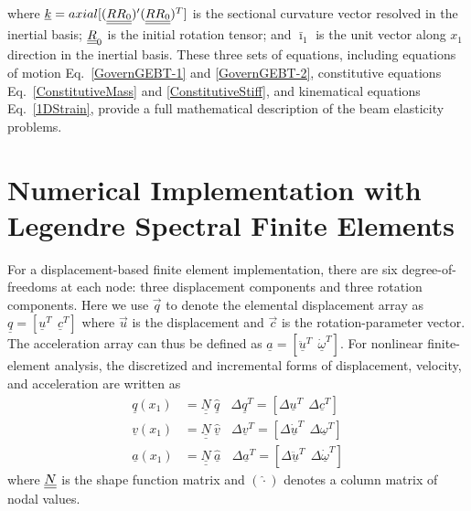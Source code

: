 where $\underline{k} = axial [(\underline{\underline{R R_0}})^\prime (\underline{\underline{R R_0}})^T]$ is the sectional
curvature vector resolved in the inertial basis; $\underline{\underline{R}}_0$ is the initial rotation tensor; and $\bar{\imath}_1$ is the unit vector along $x_1$ direction in the inertial basis. 
These three sets of equations, including equations of motion Eq.~\eqref{GovernGEBT-1} and \eqref{GovernGEBT-2}, constitutive equations
Eq.~\eqref{ConstitutiveMass} and \eqref{ConstitutiveStiff}, and kinematical
equations Eq.~\eqref{1DStrain}, provide a full mathematical description of the beam elasticity problems. 

\section{Numerical Implementation with Legendre Spectral Finite Elements}
\label{sec:NumImp}
For a displacement-based finite element implementation, there are six degree-of-freedoms at each node: three displacement components and three rotation components. 
Here we use $\vec{q}$ to denote the elemental displacement array as $\underline{q}=\left[
\underline{u}^T~~\underline{c}^T\right]$ where $\vec{u}$ is the displacement and $\vec{c}$ is the rotation-parameter vector. 
The acceleration array can thus be defined as $\underline{a}=\left[ \ddot{\underline{u}}^T~~ \dot{\underline{\omega}}^T \right]$. 
For nonlinear finite-element analysis, the discretized and incremental forms of displacement, velocity, and acceleration are written as
\begin{align}
	\label{Discretized}
	\underline{q} (x_1) &= \underline{\underline{N}} ~\hat{\underline{q}}~~~~\Delta \underline{q}^T = \left[ \Delta \underline{u}^T~~\Delta \underline{c}^T \right] \\
	\underline{v}(x_1) &= \underline{\underline{N}}~\hat{\underline{v}}~~~~\Delta \underline{v}^T = \left[\Delta \underline{\dot{u}}^T~~\Delta \underline{\omega}^T \right] \\
	\underline{a}(x_1) &= \underline{\underline{N}}~ \hat{\underline{a}}~~~~\Delta \underline{a}^T = \left[ \Delta \ddot{\underline{u}}^T~~\Delta \dot{\underline{\omega}}^T \right]	
\end{align}
where $\underline{\underline{N}}$ is the shape function matrix and $(\hat{\cdot})$ denotes a column matrix of nodal values. 

